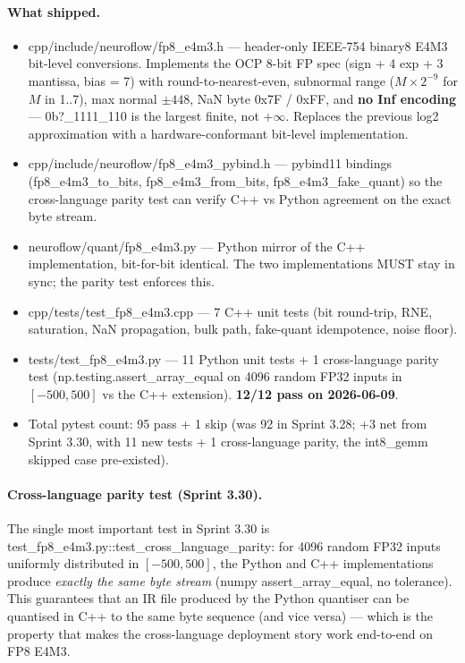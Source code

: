 \documentclass[10pt,twocolumn]{article}
\renewcommand{\texttt}[1]{{\normalfont\ttfamily #1}\normalfont\rmfamily}
\begin{document}
\paragraph{What shipped.}
\begin{itemize}
\item \texttt{cpp/include/neuroflow/fp8\_e4m3.h}
  --- header-only IEEE-754 binary8 E4M3
  bit-level conversions.  Implements the
  OCP 8-bit FP spec (sign + 4 exp +
  3 mantissa, bias = 7) with
  round-to-nearest-even, subnormal
  range ($M \times 2^{-9}$ for $M$ in
  1..7), max normal $\pm 448$, NaN byte
  \texttt{0x7F} / \texttt{0xFF}, and
  \textbf{no Inf encoding} ---
  \texttt{0b?\_1111\_110} is the largest
  finite, not $+\infty$.  Replaces the
  previous \texttt{log2} approximation
  with a hardware-conformant bit-level
  implementation.
\item \texttt{cpp/include/neuroflow/fp8\_e4m3\_pybind.h}
  --- pybind11 bindings
  (\texttt{fp8\_e4m3\_to\_bits},
  \texttt{fp8\_e4m3\_from\_bits},
  \texttt{fp8\_e4m3\_fake\_quant}) so the
  cross-language parity test can verify
  C{++} vs Python agreement on the
  exact byte stream.
\item \texttt{neuroflow/quant/fp8\_e4m3.py}
  --- Python mirror of the C{++}
  implementation, bit-for-bit
  identical.  The two implementations
  MUST stay in sync; the parity test
  enforces this.
\item \texttt{cpp/tests/test\_fp8\_e4m3.cpp}
  --- 7 C{++} unit tests (bit round-trip,
  RNE, saturation, NaN propagation,
  bulk path, fake-quant idempotence,
  noise floor).
\item \texttt{tests/test\_fp8\_e4m3.py} ---
  11 Python unit tests + 1
  cross-language parity test
  (\texttt{np.testing.assert\_array\_equal}
  on 4096 random FP32 inputs in
  $[-500, 500]$ vs the C{++} extension).
  \textbf{12/12 pass on 2026-06-09}.
\item Total pytest count: 95 pass + 1
  skip (was 92 in Sprint 3.28; +3 net
  from Sprint 3.30, with 11 new
  tests + 1 cross-language parity, the
  int8\_gemm skipped case pre-existed).
\end{itemize}

\paragraph{Cross-language parity test (Sprint 3.30).}
The single most important test in
Sprint 3.30 is
\texttt{test\_fp8\_e4m3.py::test\_cross\_language\_parity}:
for 4096 random FP32 inputs uniformly
distributed in $[-500, 500]$, the
Python and C{++} implementations
produce \emph{exactly the same byte
stream} (numpy
\texttt{assert\_array\_equal}, no
tolerance).  This guarantees that an IR
file produced by the Python quantiser
can be quantised in C{++} to the same
byte sequence (and vice versa) ---
which is the property that makes the
cross-language deployment story work
end-to-end on FP8 E4M3.
\end{document}
